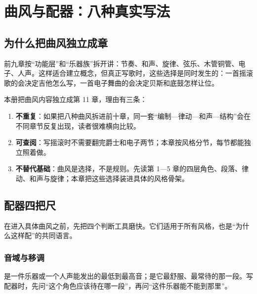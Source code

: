 \chapter{曲风与配器：八种真实写法}
\label{ch:genres}


\section{为什么把曲风独立成章}
\label{sec:genres-why}

前九章按“功能层”和“乐器族”拆开讲：节奏、和声、旋律、弦乐、木管铜管、电子、人声。这样适合建立概念，但真正写歌时，这些选择是同时发生的：一首摇滚歌的会决定吉他怎么写，一首电子舞曲的会决定贝斯和底鼓怎样让位。

本册把曲风内容独立成第 11 章，理由有三条：

\begin{enumerate}
\item \textbf{不重复}：如果把八种曲风拆进前十章，同一套“编制—律动—和声—结构”会在不同章节反复出现，读者很难横向比较。
\item \textbf{可查阅}：写摇滚时不需要翻完爵士和电子两节；本章按风格分节，每节都能独立照着做。
\item \textbf{不替代基础}：曲风是选择，不是规则。先读第 1—5 章的四层角色、段落、律动、和声与旋律；本章把这些选择装进具体的风格骨架。
\end{enumerate}

\section{配器四把尺}
\label{sec:orchestration-rulers}

在进入具体曲风之前，先把四个判断工具磨快。它们适用于所有风格，也是“为什么这样配”的共同语言。

\subsection{音域与移调}
\label{sec:range-transposition}

是一件乐器或一个人声能发出的最低到最高音；是它最舒服、最常待的那一段。写配器时，先问“这个角色应该待在哪一段”，再问“这件乐器能不能到那里”。

